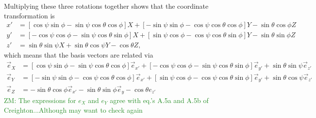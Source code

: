 \documentclass[aps,prd,amsmath,showpacs,amssymb,superscriptaddress,nofootinbib,longbibliography,eqsecnum,preprintnumbers]{revtex4-1}
\newcommand{\zach}[1]{\textcolor{ForestGreen}{#1}}
\begin{document}
Multiplying these three rotations together shows that the coordinate transformation is
\begin{align}
x'&=[\cos\psi \sin\phi-\sin\psi \cos\theta \cos\phi]X+[-\sin\psi\sin\phi-\cos\psi \cos\theta\cos\phi]Y-\sin\theta \cos\phi Z \nonumber \\
y'&=[-\cos\psi\cos\phi-\sin\psi\cos\theta\sin\phi]X
+[\sin\psi\cos\phi-\cos\psi\cos\theta\sin\phi]Y
-\sin\theta \sin\phi Z \nonumber \\
z'&=\sin\theta \sin\psi X+\sin\theta\cos\psi Y-\cos\theta Z,
\end{align}
which means that the basis vectors are related via
\begin{align}
\vec e_X&=[\cos\psi \sin\phi-\sin\psi \cos\theta \cos\phi]\vec e_{x'}
+[-\cos\psi\cos\phi-\sin\psi\cos\theta\sin\phi]\vec e_{y'}
+\sin\theta \sin\psi\vec e_{z'} \nonumber \\
\vec e_Y&=[-\sin\psi\sin\phi-\cos\psi \cos\theta\cos\phi]\vec e_{x'}
+[\sin\psi\cos\phi-\cos\psi\cos\theta\sin\phi]\vec e_{y'}
+\sin\theta\cos\psi \vec e_{z'} \\
\vec e_{Z}&=-\sin\theta \cos\phi \vec e_{x'}
-\sin\theta \sin\phi \vec e_{y} -\cos\theta e_{z'} \label{eq:wavebasis}
\end{align}
\zach{ZM: The expressions for $e_X$ and $e_Y$ agree with eq.'s A.5a and A.5b of Creighton...Although may want to check again}






\end{document}
